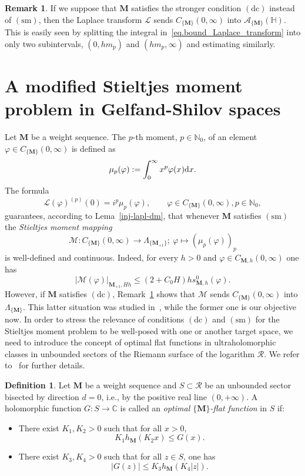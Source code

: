 \documentclass[12pt,a4paper]{article}
\newcommand{\N}{\mathbb{N}}
\newcommand{\C}{\mathbb{C}}
\newcommand{\HH}{\mathbb{H}}
\newcommand{\CM}{C_{\{\M\}}(0,\infty)}
\newcommand{\M}{{\boldsymbol{M}}}
\newcommand{\dx}{{\rm d}x }
\newcommand{\dc}{\operatorname{(dc)}}
\newcommand{\sm}{\operatorname{(sm)}}
\theoremstyle{plain}
\theoremstyle{definition}
\newtheorem{remark}[theorem]{Remark}
\newtheorem{definition}[theorem]{Definition}
\numberwithin{equation}{section}
\begin{document}
\begin{remark}\label{rem.Laplacewithdc}
If we suppose that $\M$ satisfies the stronger condition $\dc$ instead of $\sm$, then the Laplace transform $\mathcal{L}$ sends $\CM$ into $\mathcal{A}_{\{\M\}}(\HH)$. This is easily seen by splitting the integral in~\eqref{eq.bound_Laplace_transform} into only two subintervals, $(0,hm_{p})$ and $(hm_p,\infty)$ and estimating similarly.
\end{remark}

\section{A modified Stieltjes moment problem in Gelfand-Shilov spaces}\label{sect-Stiel-mom-problem-dm}
Let $\M$ be a weight sequence. The $p$-th moment, $p \in \N_0$, of an element $\varphi \in \CM$ is defined as
$$
\mu_p(\varphi) := \int_0^\infty x^p \varphi(x) \dx.
$$
The formula
\begin{equation}\label{eq.moments.deriv.Laplace}
\mathcal{L}(\varphi)^{(p)}(0) = i^p \mu_p(\varphi), \qquad \varphi \in \CM, p \in \N_0,
\end{equation}
guarantees, according to Lema~\ref{inj-lapl-dm}, that whenever $\M$ satisfies $\sm$ the \emph{Stieltjes moment mapping}
$$
\mathcal{M}: \CM \rightarrow \Lambda_{\{\M_{+1}\}};\ \varphi \mapsto (\mu_p(\varphi))_p
$$
is well-defined and continuous. Indeed, for every $h>0$ and $\varphi\in C_{\M,h}(0,\infty)$ one has
$$
|\mathcal{M}(\varphi)|_{\M_{+1},Hh}\le (2+C_0H)hs_{\M,h}^0(\varphi).
$$
However, if $\M$ satisfies $\dc$, Remark~\ref{rem.Laplacewithdc} shows that $\mathcal{M}$ sends $\CM$ into $\Lambda_{\{\M\}}$. This latter situation was studied in~\cite{DebrouwereetalMoment}, while the former one is our objective now. In order to stress the relevance of conditions $\dc$ and $\sm$ for the Stieltjes moment problem to be well-posed with one or another target space, we need to introduce the concept of optimal flat functions in ultraholomorphic classes in unbounded sectors of the Riemann surface of the logarithm $\mathcal{R}$. We refer to~\cite{JimenezMiguelSanzSchindlOptFlat} for further details.

\begin{definition}\label{optimalflatdef}
Let $\M$ be a weight sequence and $S\subset\mathcal{R}$ be an unbounded sector bisected by direction $d=0$, i.e., by the positive real line $(0,+\infty)$. A holomorphic function $G\colon S\to\C$ is called an \emph{optimal $\{\M\}$-flat function} in $S$ if:
	\begin{itemize}
		\item[$(i)$] There exist $K_1,K_2>0$ such that for all $x>0$,
		\begin{equation}\label{optimalflatleft}
			K_1h_{\M}(K_2x)\le G(x).
		\end{equation}
		
		\item[$(ii)$] There exist $K_3,K_4>0$ such that for all $z\in S$, one has
		\begin{equation}\label{optimalflatright}
			|G(z)|\le K_3h_{\M}(K_4|z|).
		\end{equation}
	\end{itemize}
\end{definition}
\end{document}
